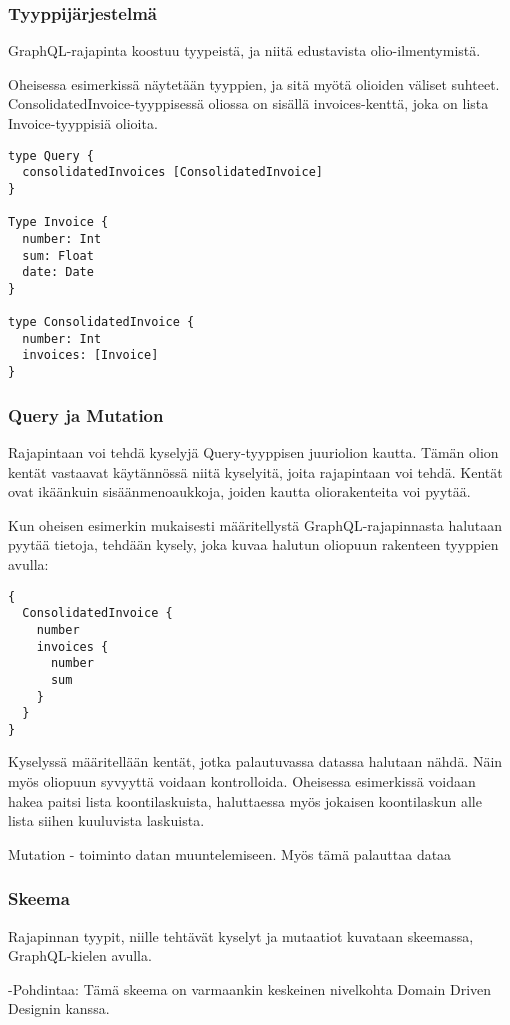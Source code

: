 \hypertarget{tyyppijuxe4rjestelmuxe4}{%
\subsubsection{Tyyppijärjestelmä}\label{tyyppijuxe4rjestelmuxe4}}

GraphQL-rajapinta koostuu tyypeistä, ja niitä edustavista
olio-ilmentymistä.

Oheisessa esimerkissä näytetään tyyppien, ja sitä myötä olioiden väliset
suhteet. ConsolidatedInvoice-tyyppisessä oliossa on sisällä
invoices-kenttä, joka on lista Invoice-tyyppisiä olioita.

\begin{verbatim}
type Query {
  consolidatedInvoices [ConsolidatedInvoice]
}

Type Invoice {
  number: Int
  sum: Float
  date: Date
}

type ConsolidatedInvoice {
  number: Int
  invoices: [Invoice]
}
\end{verbatim}

\hypertarget{query-ja-mutation}{%
\subsubsection{Query ja Mutation}\label{query-ja-mutation}}

Rajapintaan voi tehdä kyselyjä Query-tyyppisen juuriolion kautta. Tämän
olion kentät vastaavat käytännössä niitä kyselyitä, joita rajapintaan
voi tehdä. Kentät ovat ikäänkuin sisäänmenoaukkoja, joiden kautta
oliorakenteita voi pyytää.

Kun oheisen esimerkin mukaisesti määritellystä GraphQL-rajapinnasta
halutaan pyytää tietoja, tehdään kysely, joka kuvaa halutun oliopuun
rakenteen tyyppien avulla:

\begin{verbatim}
{
  ConsolidatedInvoice {
    number
    invoices {
      number
      sum
    }
  }
}
\end{verbatim}

Kyselyssä määritellään kentät, jotka palautuvassa datassa halutaan
nähdä. Näin myös oliopuun syvyyttä voidaan kontrolloida. Oheisessa
esimerkissä voidaan hakea paitsi lista koontilaskuista, haluttaessa myös
jokaisen koontilaskun alle lista siihen kuuluvista laskuista.

Mutation - toiminto datan muuntelemiseen. Myös tämä palauttaa dataa

\hypertarget{skeema}{%
\subsubsection{Skeema}\label{skeema}}

Rajapinnan tyypit, niille tehtävät kyselyt ja mutaatiot kuvataan
skeemassa, GraphQL-kielen avulla.

-Pohdintaa: Tämä skeema on varmaankin keskeinen nivelkohta Domain Driven
Designin kanssa.
